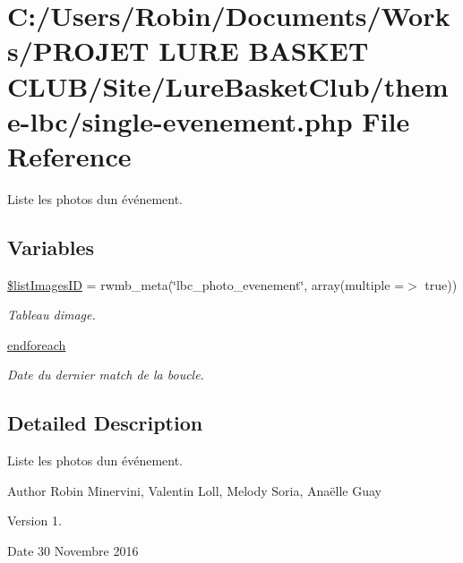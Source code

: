 \hypertarget{single-evenement_8php}{}\section{C\+:/\+Users/\+Robin/\+Documents/\+Works/\+P\+R\+O\+J\+ET L\+U\+RE B\+A\+S\+K\+ET C\+L\+U\+B/\+Site/\+Lure\+Basket\+Club/theme-\/lbc/single-\/evenement.php File Reference}
\label{single-evenement_8php}


Liste les photos d\textquotesingle{}un événement.  


\subsection*{Variables}
\begin{DoxyCompactItemize}
\item 
\hyperlink{single-evenement_8php_a248886ee17994b66f2ceb783403a3aec}{\$list\+Images\+ID} = rwmb\+\_\+meta(\char`\"{}lbc\+\_\+photo\+\_\+evenement\char`\"{}, array(\textquotesingle{}multiple\textquotesingle{} =$>$ true))
\begin{DoxyCompactList}\small\item\em Tableau d\textquotesingle{}image. \end{DoxyCompactList}\item 
\hyperlink{single-evenement_8php_a672d9707ef91db026c210f98cc601123}{endforeach}
\begin{DoxyCompactList}\small\item\em Date du dernier match de la boucle. \end{DoxyCompactList}\end{DoxyCompactItemize}


\subsection{Detailed Description}
Liste les photos d\textquotesingle{}un événement. 

\begin{DoxyAuthor}{Author}
Robin Minervini, Valentin Loll, Melody Soria, Anaëlle Guay 
\end{DoxyAuthor}
\begin{DoxyVersion}{Version}
1. 
\end{DoxyVersion}
\begin{DoxyDate}{Date}
30 Novembre 2016 
\end{DoxyDate}


